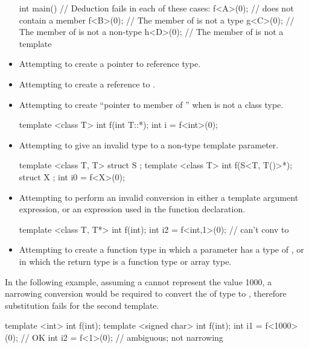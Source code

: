 \begin{note}
\begin{itemize}
\begin{example}
\begin{codeblock}
int main() {
  // Deduction fails in each of these cases:
  f<A>(0);          //  does not contain a member 
  f<B>(0);          // The  member of  is not a type
  g<C>(0);          // The  member of  is not a non-type
  h<D>(0);          // The  member of  is not a template
}
\end{codeblock}
\end{example}
\item
Attempting to create a pointer to reference type.
\item
Attempting to create a reference to .
\item
Attempting to create ``pointer to member of '' when  is not a
class type.
\begin{example}
\begin{codeblock}
template <class T> int f(int T::*);
int i = f<int>(0);
\end{codeblock}
\end{example}
\item
Attempting to give an invalid type to a non-type template parameter.
\begin{example}
\begin{codeblock}
template <class T, T> struct S {};
template <class T> int f(S<T, T()>*);
struct X {};
int i0 = f<X>(0);
\end{codeblock}
\end{example}

\item
Attempting to perform an invalid conversion in either a template
argument expression, or an expression used in the function
declaration.
\begin{example}

\begin{codeblock}
template <class T, T*> int f(int);
int i2 = f<int,1>(0);           // can't conv  to 
\end{codeblock}
\end{example}

\item
Attempting to create a function type in which a parameter has a type
of , or in which the return type is a function type
or array type.
\end{itemize}
\end{note}

\pnum
\begin{example}
In the following example,
assuming a 
cannot represent the value 1000,
a narrowing conversion
would be required
to convert the 
of type  to ,
therefore substitution fails for the
second template.

\begin{codeblock}
template <int> int f(int);
template <signed char> int f(int);
int i1 = f<1000>(0);            // OK
int i2 = f<1>(0);               // ambiguous; not narrowing
\end{codeblock}
\end{example}

